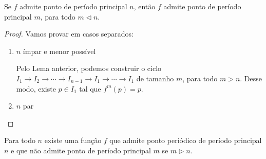 \begin{theorem}
Se $f$ admite ponto de período principal $n$, então $f$ admite ponto de período principal $m$, para todo $m \triangleleft n$.
\end{theorem}

\begin{proof}
Vamos provar em casos separados:
\begin{enumerate}[label = (\alph*)]
\item $n$ ímpar e menor possível

Pelo Lema anterior,  podemos construir o ciclo $I_1 \longrightarrow I_2 \longrightarrow \cdots \longrightarrow I_{n-1} \longrightarrow I_1 \longrightarrow \cdots \longrightarrow I_1$ de tamanho $m$, para todo $m > n$. Desse modo, existe $p \in I_1$ tal que $f^m(p) = p$.

\item $n$ par
\end{enumerate}
\end{proof}

\begin{theorem}
Para todo $n$ existe uma função $f$ que admite ponto periódico de período principal $n$ e que não admite ponto de período principal $m$ se $m \triangleright n$.
\end{theorem}

